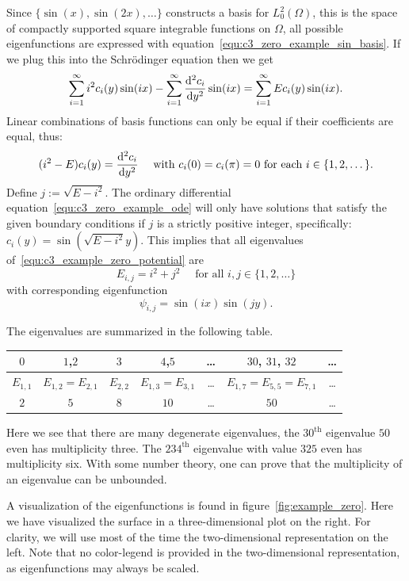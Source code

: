 Since $\{\sin(x), \sin(2x), \dots\}$ constructs a basis for $L^2_0(\Omega)$, this is the space of compactly supported square integrable functions on $\Omega$, all possible eigenfunctions are expressed with equation~\eqref{equ:c3_zero_example_sin_basis}. If we plug this into the Schrödinger equation then we get
$$
  \sum_{i=1}^\infty i^2 c_i(y) \sin(ix) - \sum_{i=1}^\infty \dv[2]{c_i}{y}(y) \sin(ix) = \sum_{i=1}^\infty E c_i(y) \sin(ix)\text{.}
$$
Linear combinations of basis functions can only be equal if their coefficients are equal, thus:
\begin{equation}\label{equ:c3_zero_example_ode}
  (i^2 - E) c_i(y) = \dv[2]{c_i}{y}(y) \quad \text{ with $c_i(0) = c_i(\pi) = 0$ for each $i \in \{1, 2, \dots\}$.}
\end{equation}
Define $j := \sqrt{E - i^2}$. The ordinary differential equation~\eqref{equ:c3_zero_example_ode} will only have solutions that satisfy the given boundary conditions if $j$ is a strictly positive integer, specifically: $c_i(y) = \sin\left(\sqrt{E-i^2} y\right)$. This implies that all eigenvalues of~\eqref{equ:c3_example_zero_potential} are
$$
  E_{i, j} = i^2 + j^2 \quad \text{ for all $i, j \in \{1, 2, \dots\}$}
$$
with corresponding eigenfunction
\begin{equation}\label{equ:c3_zero_example_eigenfunctions}
  \psi_{i,j} = \sin(ix) \sin(jy)\text{.}
\end{equation}

The eigenvalues are summarized in the following table.

\begin{tabular}{ccccccc}
  \toprule
  $0$       & $1$,$2$             & $3$       & $4$,$5$             & \dots & $30$, $31$, $32$              & \dots \\
  \midrule
  $E_{1,1}$ & $E_{1,2} = E_{2,1}$ & $E_{2,2}$ & $E_{1,3} = E_{3,1}$ & \dots & $E_{1,7} = E_{5,5} = E_{7,1}$ & \dots \\
  $2$       & $5$                 & $8$       & $10$                & \dots & $50$                          & \dots \\
  \bottomrule
\end{tabular}

Here we see that there are many degenerate eigenvalues, the $30^\text{th}$ eigenvalue $50$ even has multiplicity three. The $234^\text{th}$ eigenvalue with value $325$ even has multiplicity six. With some number theory, one can prove that the multiplicity of an eigenvalue can be unbounded.

A visualization of the eigenfunctions is found in figure~\ref{fig:example_zero}. Here we have visualized the surface in a three-dimensional plot on the right. For clarity, we will use most of the time the two-dimensional representation on the left. Note that no color-legend is provided in the two-dimensional representation, as eigenfunctions may always be scaled.

